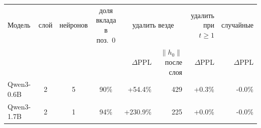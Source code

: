 \begin{tabular}{lcccrrrr}
\toprule
Модель & слой & нейронов & доля вклада в поз.~0 & \multicolumn{2}{c}{удалить везде} & удалить при $t\ge1$ & случайные \\
 & & & & $\Delta$PPL & $\|h_0\|$ после слоя & $\Delta$PPL & $\Delta$PPL \\
\midrule
Qwen3-0.6B & 2 & 5 & 90\% & +54.4\% & 429 & +0.3\% & -0.0\% \\
Qwen3-1.7B & 2 & 1 & 94\% & +230.9\% & 225 & +0.0\% & -0.0\% \\
\bottomrule
\end{tabular}
